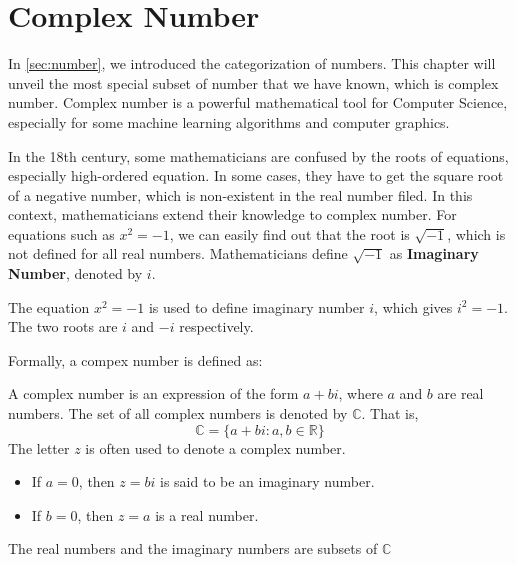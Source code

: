 \documentclass[
	12pt, %
	fleqn, %
	a4paper, %
]{LegrandOrangeBook}
\begin{document}
\chapterspaceabove{6.75cm} 
\chapterspacebelow{7.25cm} 
\chapter{Complex Number}
In \autoref{sec:number}, we introduced the categorization of numbers. This chapter will unveil the
most special subset of number that we have known, which is complex number. Complex number is a powerful
mathematical tool for Computer Science, especially for some machine learning algorithms and computer graphics.

In the 18th century, some mathematicians are confused by the roots of equations, especially  high-ordered equation.
In some cases, they have to get the square root of a negative number, which is non-existent in the real number filed.
In this context, mathematicians extend their knowledge to complex number. For equations such as $x^2 = -1$,
we can easily find out that the root is $\sqrt{-1}$, which is not defined for all real numbers. Mathematicians
define $\sqrt{-1}$ as \textbf{Imaginary Number}, denoted by $i$.
\begin{definition}
    The equation $x^2 = -1$ is used to define imaginary number $i$, which gives $i^2 = -1$. The two roots are $i$
    and $-i$ respectively.
\end{definition}

Formally, a compex number is defined as:
\begin{definition}
    A complex number is an expression of the form \(a + bi\), where \(a\) and \(b\) are real numbers.
The set of all complex numbers is denoted by \(\mathbb{C}\). That is,
\[
\mathbb{C} = \{ a + bi : a, b \in \mathbb{R} \}
\]
The letter \(z\) is often used to denote a complex number.
\begin{itemize}
    \item If \( a = 0 \), then \( z = bi \) is said to be an imaginary number.
    \item If \( b = 0 \), then \( z = a \) is a real number.
\end{itemize}
The real numbers and the imaginary numbers are subsets of \( \mathbb{C} \)
\end{definition}
\end{document}
